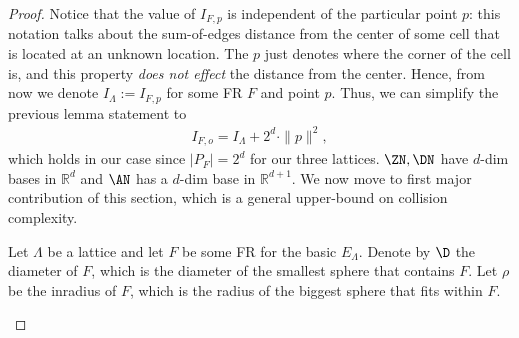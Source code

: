 \begin{proof}
Notice that the value of $I_{F,p}$ is independent  of the particular point $p$: this notation talks about the sum-of-edges distance from the center of some cell that is located at an unknown location. The $p$ just denotes where the corner of the cell is, and this property \emph{does not effect} the distance from the center.     Hence, from now we denote $I_{\Lambda}:=I_{F,p}$ for some FR $F$ and point $p$. Thus, we can simplify the previous lemma statement to 
\begin{align}
            I_{F,o} = I_\Lambda + 2^d\cdot \|p\|^2,
\end{align}
which holds in our case since  $|P_F|=2^d$ for our three lattices. $\ZN,\DN$ have $d$-dim bases in $\mathbb{R}^d$ and $\AN$ has a $d$-dim base in $\mathbb{R}^{d+1}$.
We now move to first major contribution of this section, which is a general upper-bound on collision complexity.
\begin{thm}\label{complexity_upper_bound}
    Let $\Lambda$ be a lattice and let $F$ be some FR for the basic $E_\Lambda$. Denote by $\D$ the diameter of $F$, which is the diameter of the smallest sphere that contains $F$. Let $\rho$ be the inradius of $F$, which is the radius of the biggest  sphere that fits within $F$.

\end{thm}
\end{proof}
